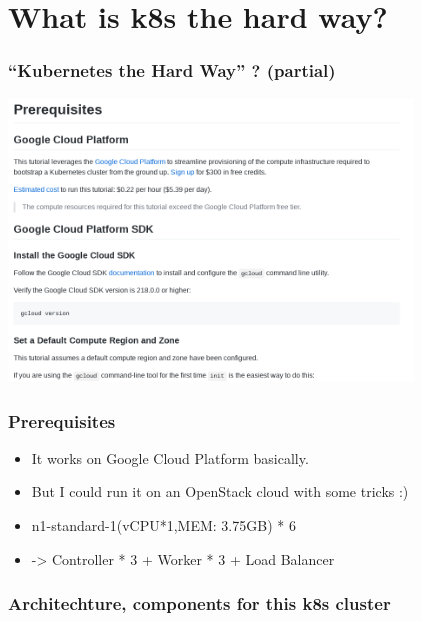 \documentclass[aspectratio=169,11pt,hyperref={colorlinks=true}]{beamer}
\begin{document}
\section{What is k8s the hard way?}
\begin{frame}
  \frametitle{``Kubernetes the Hard Way'' ? (partial)}
  \includegraphics[height=75mm]{images/screenshot-k8s-the-hard-way.png}
\end{frame}

\begin{frame}
  \frametitle{Prerequisites}
  \begin{itemize}
    \item It works on Google Cloud Platform basically.
    \item[] But I could run it on an OpenStack cloud with some tricks :)
    \item n1-standard-1(vCPU*1,MEM: 3.75GB) * 6
    \item[] -> Controller * 3 + Worker * 3 + Load Balancer
  \end{itemize}
\end{frame}

\begin{frame}
  \frametitle{Architechture, components for this k8s cluster}
\end{frame}
\end{document}
